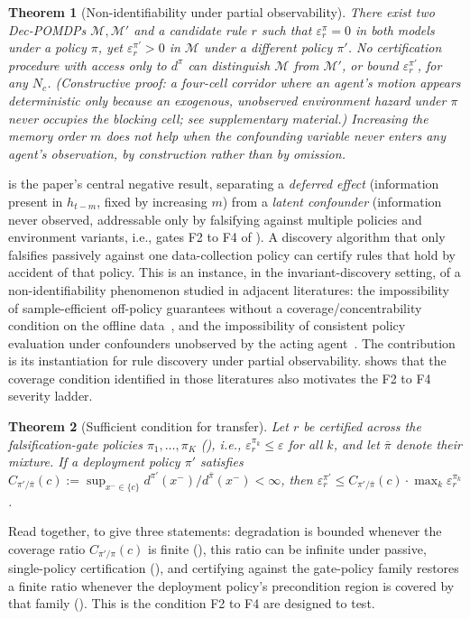 \documentclass[letterpaper]{article} %
\let\autoref\Cref
\theoremstyle{plain}
\newtheorem{theorem}{Theorem}[section]
\theoremstyle{definition}
\theoremstyle{remark}
\begin{document}
\begin{theorem}[Non-identifiability under partial observability]
  \label{thm:t5}
  There exist two Dec-POMDPs $\mathcal{M},\mathcal{M}'$ and a candidate rule $r$ such that $\varepsilon^\pi_r=0$ in both models under a policy $\pi$, yet $\varepsilon^{\pi'}_r>0$ in $\mathcal{M}$ under a different policy $\pi'$. No certification procedure with access only to $d^\pi$ can distinguish $\mathcal{M}$ from $\mathcal{M}'$, or bound $\varepsilon^{\pi'}_r$, for any $N_c$. \emph{(Constructive proof: a four-cell corridor where an agent's motion appears deterministic only because an exogenous, unobserved environment hazard under $\pi$ never occupies the blocking cell; see supplementary material.)} Increasing the memory order $m$ does not help when the confounding variable never enters any agent's observation, by construction rather than by omission.
\end{theorem}
\autoref{thm:t5} is the paper's central negative result, separating a \emph{deferred effect} (information present in $h_{t-m}$, fixed by increasing $m$) from a \emph{latent confounder} (information never observed, addressable only by falsifying against multiple policies and environment variants, i.e., gates F2 to F4 of \autoref{alg:main}). A discovery algorithm that only falsifies passively against one data-collection policy can certify rules that hold by accident of that policy. This is an instance, in the invariant-discovery setting, of a non-identifiability phenomenon studied in adjacent literatures: the impossibility of sample-efficient off-policy guarantees without a coverage/concentrability condition on the offline data~\cite{chen2019information}, and the impossibility of consistent policy evaluation under confounders unobserved by the acting agent~\cite{namkoong2020offpolicy}. The contribution is its instantiation for rule discovery under partial observability. \autoref{thm:t7} shows that the coverage condition identified in those literatures also motivates the F2 to F4 severity ladder.

\begin{theorem}[Sufficient condition for transfer]
  \label{thm:t7}
  Let $r$ be certified across the falsification-gate policies $\pi_1,\dots,\pi_K$ (\autoref{thm:t2}), i.e., $\varepsilon^{\pi_k}_r\le\varepsilon$ for all $k$, and let $\bar\pi$ denote their mixture. If a deployment policy $\pi'$ satisfies $C_{\pi'/\bar\pi}(c):=\sup_{x^-\in\{c\}}d^{\pi'}(x^-)/d^{\bar\pi}(x^-)<\infty$, then $\varepsilon^{\pi'}_r \le C_{\pi'/\bar\pi}(c)\cdot\max_k\varepsilon^{\pi_k}_r$.
\end{theorem}
Read together, \autoref{thm:t4} to \autoref{thm:t7} give three statements: degradation is bounded whenever the coverage ratio $C_{\pi'/\pi}(c)$ is finite (\autoref{thm:t4}), this ratio can be infinite under passive, single-policy certification (\autoref{thm:t5}), and certifying against the gate-policy family restores a finite ratio whenever the deployment policy's precondition region is covered by that family (\autoref{thm:t7}). This is the condition F2 to F4 are designed to test.
\end{document}
